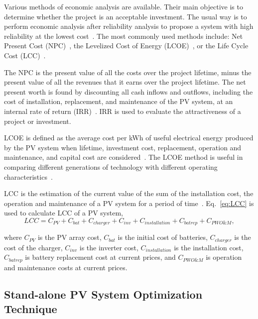 Various methods of economic analysis are available. Their main objective is to determine whether the project is an acceptable investment. The usual way is to perform economic analysis after reliability analysis to propose a system with high reliability at the lowest cost~\cite{Alsadi2018}. The most commonly used methods include: Net Present Cost (NPC)~\cite{Park2004}, the Levelized Cost of Energy (LCOE)~\cite{Zhou2010}, or the Life Cycle Cost (LCC)~\cite{Applasamy2011}.

The NPC is the present value of all the costs over the project lifetime, minus the present value of all the revenues that it earns over the project lifetime. The net present worth is found by discounting all cash inflows and outflows, including the cost of installation, replacement, and maintenance of the PV system, at an internal rate of return (IRR)~\cite{Park2004}. IRR is used to evaluate the attractiveness of a project or investment.

LCOE is defined as the average cost per kWh of useful electrical energy produced by the PV system when lifetime, investment cost, replacement, operation and maintenance, and capital cost are considered~\cite{Kamel2005}. The LCOE method is useful in comparing different generations of technology with different operating characteristics~\cite{Zhou2010}.

LCC is the estimation of the current value of the sum of the installation cost, the operation and maintenance of a PV system for a period of time~\cite{Applasamy2011}. Eq.~\eqref{eq:LCC} is used to calculate LCC of a PV system,
%
\begin{equation}
\label{eq:LCC}
LCC = C_{PV} + C_{bat} + C_{charger} + C_{inv} + C_{installation} + C_{batrep} + C_{PWO\&M},
\end{equation}

\noindent where $C_{PV}$ is the PV array cost, $C_{bat}$ is the initial cost of batteries, $C_{charger}$ is the cost of the charger, $C_{inv}$ is the inverter cost, $C_{installation}$ is the installation cost, $C_{batrep}$ is battery replacement cost at current prices, and $C_{PWO\&M}$ is operation and maintenance costs at current prices.

\subsection{Stand-alone PV System Optimization Technique}

